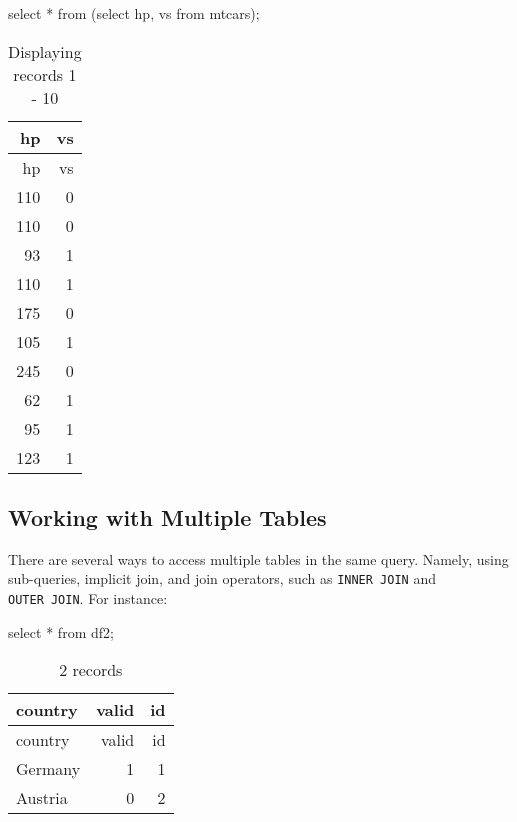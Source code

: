 \documentclass[
  letterpaper,
  DIV=11,
  numbers=noendperiod]{scrreprt}
\newenvironment{Shaded}{\begin{snugshade}}{\end{snugshade}}
\newcommand{\KeywordTok}[1]{\textcolor[rgb]{0.00,0.23,0.31}{#1}}
\newcommand{\NormalTok}[1]{\textcolor[rgb]{0.00,0.23,0.31}{#1}}
\newcommand{\OperatorTok}[1]{\textcolor[rgb]{0.37,0.37,0.37}{#1}}
\begin{document}
\begin{Shaded}
\begin{Highlighting}[]
\KeywordTok{select} \OperatorTok{*} \KeywordTok{from}\NormalTok{ (}\KeywordTok{select}\NormalTok{ hp, vs }\KeywordTok{from}\NormalTok{ mtcars);}
\end{Highlighting}
\end{Shaded}

\begin{longtable}[]{@{}rr@{}}
\caption{Displaying records 1 - 10}\tabularnewline
\toprule()
hp & vs \\
\midrule()
\endfirsthead
\toprule()
hp & vs \\
\midrule()
\endhead
110 & 0 \\
110 & 0 \\
93 & 1 \\
110 & 1 \\
175 & 0 \\
105 & 1 \\
245 & 0 \\
62 & 1 \\
95 & 1 \\
123 & 1 \\
\bottomrule()
\end{longtable}

\hypertarget{working-with-multiple-tables}{%
\subsection{Working with Multiple
Tables}\label{working-with-multiple-tables}}

There are several ways to access multiple tables in the same query.
Namely, using sub-queries, implicit join, and join operators, such as
\texttt{INNER\ JOIN} and \texttt{OUTER\ JOIN}. For instance:

\begin{Shaded}
\begin{Highlighting}[]
\KeywordTok{select} \OperatorTok{*} \KeywordTok{from}\NormalTok{ df2;}
\end{Highlighting}
\end{Shaded}

\begin{longtable}[]{@{}lrr@{}}
\caption{2 records}\tabularnewline
\toprule()
country & valid & id \\
\midrule()
\endfirsthead
\toprule()
country & valid & id \\
\midrule()
\endhead
Germany & 1 & 1 \\
Austria & 0 & 2 \\
\bottomrule()
\end{longtable}
\end{document}
